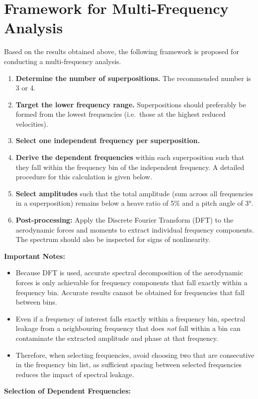 \documentclass[../main]{subfiles}
\begin{document}
\section{Framework for Multi-Frequency Analysis}

Based on the results obtained above, the following framework is proposed for conducting a 
multi-frequency analysis.

\begin{enumerate}
    \item \textbf{Determine the number of superpositions.} The recommended number is 3 or 4.

    \item \textbf{Target the lower frequency range.} Superpositions should preferably be formed 
          from the lowest frequencies (i.e.\ those at the highest reduced velocities).

    \item \textbf{Select one independent frequency per superposition.}

    \item \textbf{Derive the dependent frequencies} within each superposition such that they 
          fall within the frequency bin of the independent frequency. A detailed procedure 
          for this calculation is given below.

    \item \textbf{Select amplitudes} such that the total amplitude (sum across all frequencies 
          in a superposition) remains below a heave ratio of 5\% and a pitch angle of 3°.

    \item \textbf{Post-processing:} Apply the Discrete Fourier Transform (DFT) to the 
          aerodynamic forces and moments to extract individual frequency components. 
          The spectrum should also be inspected for signs of nonlinearity.
\end{enumerate}

\vspace{0.5em}
\textbf{Important Notes:}

\begin{itemize}
    \item Because DFT is used, accurate spectral decomposition of the aerodynamic forces is 
          only achievable for frequency components that fall exactly within a frequency bin. 
          Accurate results cannot be obtained for frequencies that fall between bins.

    \item Even if a frequency of interest falls exactly within a frequency bin, spectral leakage 
          from a neighbouring frequency that does \emph{not} fall within a bin can contaminate 
          the extracted amplitude and phase at that frequency.

    \item Therefore, when selecting frequencies, avoid choosing two that are consecutive 
          in the frequency bin list, as sufficient spacing between selected frequencies 
          reduces the impact of spectral leakage.
\end{itemize}

\vspace{0.5em}
\textbf{Selection of Dependent Frequencies:}
\end{document}
